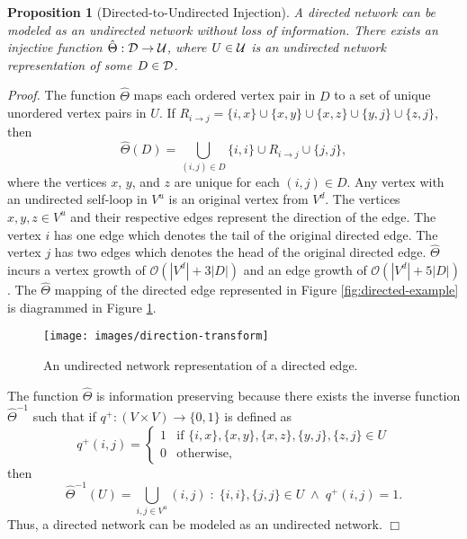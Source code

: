 \documentclass[twocolumn,preprintnumbers,amsmath,amssymb,letter]{revtex4}
\newcommand{\rar}{\rightarrow}
\newtheorem{proposition}{Proposition}
\newcommand{\qed}{\hfill $\Box$ \hfill \\}
\begin{document}
\begin{proposition}[Directed-to-Undirected Injection]
A directed network can be modeled as an undirected network without loss of information. There exists an injective function $\hat{\Theta} : \cal{D} \rar \cal{U}$, where $U \in \cal{U}$ is an undirected network representation of some $D \in \cal{D}$.
\end{proposition}
\emph{Proof.} The function $\hat{\Theta}$ maps each ordered vertex pair in $D$ to a set of unique unordered vertex pairs in $U$. If $R_{i \rar j} = \{i,x\} \cup \{x,y\} \cup \{x,z\} \cup \{y,j\} \cup \{z,j\}$, then
\begin{equation*}
	\hat{\Theta}(D) = \bigcup_{(i,j) \in D} \{i,i\} \cup R_{i \rar j} \cup \{j,j\},
\end{equation*}
where the vertices $x$, $y$, and $z$ are unique for each $(i,j) \in D$. Any vertex with an undirected self-loop in $V^u$ is an original vertex from $V^d$. The vertices $x,y,z \in V^u$ and their respective edges represent the direction of the edge. The vertex $i$ has one edge which denotes the tail of the original directed edge. The vertex $j$ has two edges which denotes the head of the original directed edge. $\hat{\Theta}$ incurs a vertex growth of $\mathcal{O}(|V^d| + 3|D|)$ and an edge growth of $\mathcal{O}(|V^d| + 5|D|)$. The $\hat{\Theta}$ mapping of the directed edge represented in Figure \ref{fig:directed-example} is diagrammed in Figure \ref{fig:direction-transform}.
\begin{figure}[h!]
	\centering
	\texttt{[image: images/direction-transform]}
	 \caption{\label{fig:direction-transform}An undirected network representation of a directed edge.}
\end{figure}

The function $\hat{\Theta}$ is information preserving because there exists the inverse function $\hat{\Theta}^{-1}$ such that if $q^+: (V \times V) \rar \{0,1\}$ is defined as
\begin{equation*}
	q^+(i,j) = 
	\begin{cases}
		1 & \text{if } \{i,x\},\{x,y\},\{x,z\},\{y,j\},\{z,j\} \in U \\
		0 & \text{otherwise},
	\end{cases}
\end{equation*}
then
\begin{equation*}
	\hat{\Theta}^{-1}(U) = \bigcup_{i,j \in V^u} (i,j) \; : \; \{i,i\},\{j,j\} \in U \; \wedge \; q^+(i,j) = 1.
\end{equation*}
Thus, a directed network can be modeled as an undirected network. \qed
\end{document}

